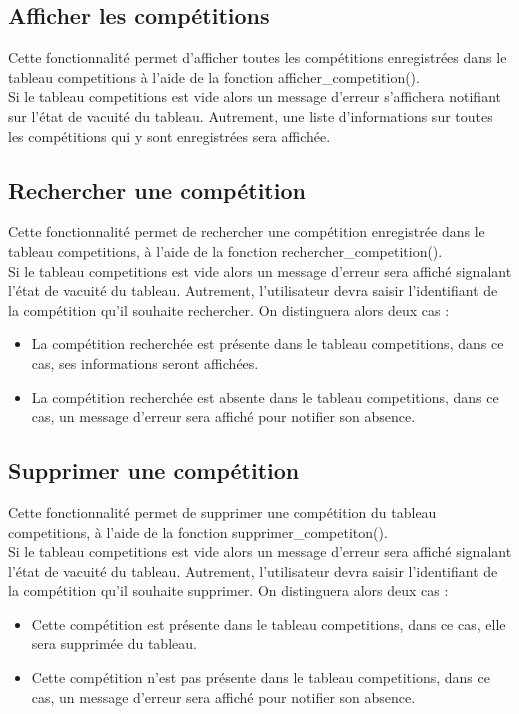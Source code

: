 \documentclass[12pt,a4paper]{report}
\begin{document}
\subsection{Afficher les compétitions}
Cette fonctionnalité permet d'afficher toutes les compétitions enregistrées dans le tableau competitions à l'aide de la fonction afficher\_competition().\\
Si le tableau competitions est vide alors un message d'erreur s'affichera notifiant sur l'état de vacuité du tableau.
Autrement, une liste d'informations sur toutes les compétitions qui y sont enregistrées sera affichée.

\subsection{Rechercher une compétition} 
Cette fonctionnalité permet de rechercher une compétition enregistrée dans le tableau competitions, à l'aide de la fonction rechercher\_competition().\\
Si le tableau competitions est vide alors un message d'erreur sera affiché signalant l'état de vacuité du tableau. Autrement, l'utilisateur devra saisir l'identifiant de la compétition qu'il souhaite rechercher. On distinguera alors deux cas : 
\begin{itemize}
	\item La compétition recherchée est présente dans le tableau competitions, dans ce cas, ses informations seront affichées.
	\item La compétition recherchée est absente dans le tableau competitions, dans ce cas, un message d'erreur sera affiché pour notifier son absence. 
\end{itemize}
 
\subsection{Supprimer une compétition}
Cette fonctionnalité permet de supprimer une compétition du tableau competitions, à l'aide de la fonction supprimer\_competiton().\\
Si le tableau competitions est vide alors un message d'erreur sera affiché signalant l'état de vacuité du tableau. Autrement, l'utilisateur devra saisir l'identifiant de la compétition qu'il souhaite supprimer. On distinguera alors deux cas : 
\begin{itemize}
	\item Cette compétition est présente dans le tableau competitions, dans ce cas, elle sera supprimée du tableau.
	\item Cette compétition n'est pas présente dans le tableau competitions, dans ce cas, un message d'erreur sera affiché pour notifier son absence. 
\end{itemize} 
\end{document}
